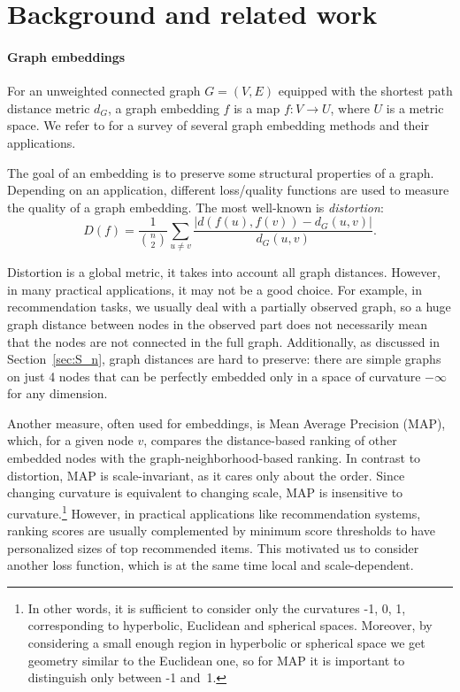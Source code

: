 \documentclass{article} %
\begin{document}
\section{Background and related work}\label{sec:related_work}

\paragraph{Graph embeddings} 
For an unweighted connected graph $G = (V,E)$ equipped with the shortest path distance metric $d_G$, a graph embedding $f$ is a map $f: V \rightarrow U$, where $U$ is a metric space.
We refer to \cite{goyal2018graph} for a survey of several graph embedding methods and their applications. 

The goal of an embedding is to preserve some structural properties of a graph.
Depending on an application, different loss/quality functions are used to measure the quality of a graph embedding. The most well-known is \textit{distortion}:
\[
D(f) = \frac{1}{\binom{n}{2}} \sum_{u \neq v}  \frac{|d(f(u),f(v)) - d_G(u,v)|}{d_G(u,v)}.
\]

Distortion is a global metric, it takes into account all graph distances. However, in many practical applications, it may not be a good choice. For example, in recommendation tasks, we usually deal with a partially observed graph, so a huge graph distance between nodes in the observed part does not necessarily mean that the nodes are not connected in the full graph. Additionally, as discussed in Section~\ref{sec:S_n}, graph distances are hard to preserve: there are simple graphs on just 4 nodes that can be perfectly embedded only in a space of curvature $-\infty$ for any dimension.

Another measure, often used for embeddings, is Mean Average Precision (MAP), which, for a given node $v$, compares the distance-based ranking of other embedded nodes with the graph-neighborhood-based ranking. In contrast to distortion, MAP is scale-invariant, as it cares only about the order. Since changing curvature is equivalent to changing scale, MAP is insensitive to curvature.\footnote{In other words, it is sufficient to consider only the curvatures -1, 0, 1, corresponding to hyperbolic, Euclidean and spherical spaces. Moreover, by considering a small enough region in hyperbolic or spherical space we get geometry similar to the Euclidean one, so for MAP it is important to distinguish only between -1 and~1.} 
However, in practical applications like recommendation systems, ranking scores are usually complemented by minimum score thresholds to have personalized sizes of top recommended items.
This motivated us to consider another loss function, which is at the same time local and scale-dependent. 
\end{document}
